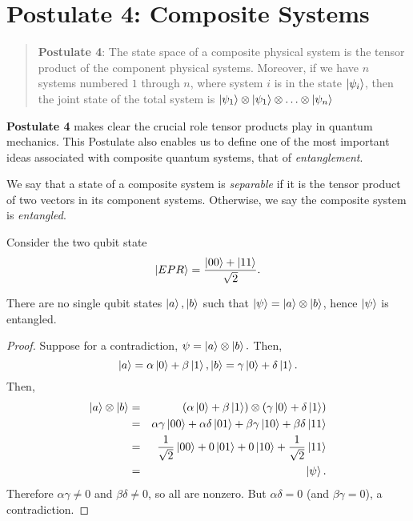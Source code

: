 

\pagebreak
\section{Postulate 4: Composite Systems} \label{section: composite systems}
\begin{quote}
    \textbf{Postulate 4}:  The state space of a composite physical system is the tensor product of the component physical systems. Moreover, if we have $n$ systems numbered $1$ through $n$, where system $i$ is in the state $\ket{\psi_i}$, then the joint state of the total system is $\ket{\psi_1} \otimes \ket{\psi_1} \otimes \hdots \otimes \ket{\psi_n}$
\end{quote}



{\bf{Postulate 4}} makes clear the crucial role tensor products play in quantum mechanics.  This Postulate also enables us to define one of the most important ideas associated with composite quantum systems, that of \textit{entanglement}. 


\begin{definition}\label{definition: entanglement with state vector}
We say that a state of a composite system is \textit{separable} if it is the tensor product of two vectors in its component systems. Otherwise, we say the composite system is \textit{entangled}.
\end{definition}


\begin{example} \label{example: entangled state}
Consider the two qubit state 
\begin{equation}\label{eqn: epr}
    \ket{EPR}=\frac{\ket{00}+\ket{11}}{\sqrt{2}}.
\end{equation}

There are no single qubit states $\ket{a}, \ket{b}$ such that $\ket{\psi}=\ket{a}\otimes \ket{b}$, hence $\ket{\psi}$ is entangled.
\begin{proof}
Suppose for a contradiction, $\psi = \ket{a} \otimes \ket{b}.$  Then, 
$$\ket{a}=\alpha \ket{0}+\beta \ket{1}, \ket{b}=\gamma\ket{0}+\delta\ket{1}.$$
Then,
\begin{eqnarray}
\ket{a}\otimes \ket{b} &=& (\alpha \ket{0}+\beta \ket{1}) \otimes (\gamma\ket{0}+\delta\ket{1})\\
&=& \alpha \gamma \ket{00}+\alpha \delta \ket{01}+\beta \gamma\ket{10}+\beta\delta\ket{11}\\
&=&\frac{1}{\sqrt{2}}\ket{00}+0\ket{01}+0\ket{10}+\frac{1}{\sqrt{2}}\ket{11}\\
&=&\ket{\psi}.
\end{eqnarray}
Therefore $\alpha \gamma \neq 0$ and $\beta \delta \neq 0$, so all are nonzero.  But $\alpha \delta =0$ (and $\beta \gamma=0$), a contradiction.
\end{proof}
\end{example}


